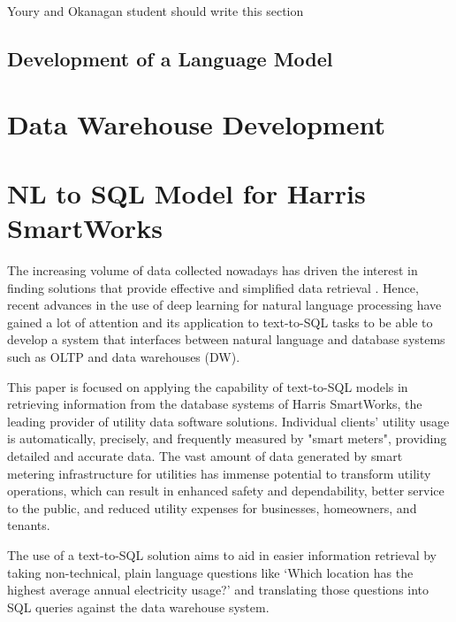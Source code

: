 \documentclass[conference]{IEEEtran}
\begin{document}
Youry and Okanagan student should write this section

\subsection{Development of a Language Model}



\section{Data Warehouse Development} 



\setlength{\fboxrule}{2pt}
\bigskip


\section{NL to SQL Model for Harris SmartWorks} 

The increasing volume of data collected nowadays has driven the interest in finding solutions that provide effective and simplified data retrieval  \cite{Wong2021ASystems}. Hence, recent advances in the use of deep learning for natural language processing have gained a lot of attention and its application to text-to-SQL tasks to be able to develop a system that interfaces between natural language and database systems such as OLTP and data warehouses (DW).

This paper is focused on applying the capability of text-to-SQL models in retrieving information from the database systems of Harris SmartWorks, the leading provider of utility data software solutions. Individual clients' utility usage is automatically, precisely, and frequently measured by "smart meters", providing detailed and accurate data. The vast amount of data generated by smart metering infrastructure for utilities has immense potential to transform utility operations, which can result in enhanced safety and dependability, better service to the public, and reduced utility expenses for businesses, homeowners, and tenants.

The use of a text-to-SQL solution aims to aid in easier information retrieval by taking non-technical, plain language questions like ‘Which location has the highest average annual electricity usage?’ and translating those questions into SQL queries against the data warehouse system.
\end{document}

